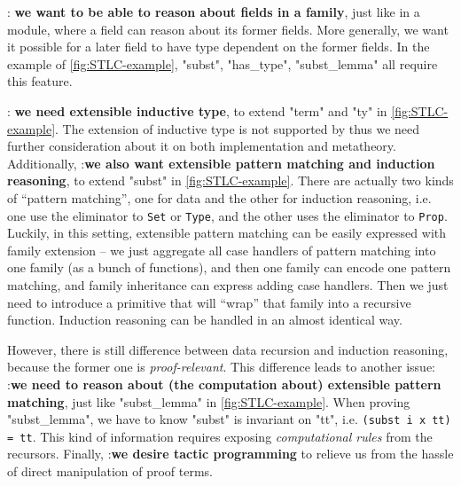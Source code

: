 :\textbf{ we want to be able to reason about fields in a family}, just like in a module, where a field can reason about its former fields. More generally, we want it possible for a later field to have type dependent on the former fields. In the example of \cref{fig:STLC-example}, "subst", "has_type", "subst_lemma" all require this feature.

:\textbf{ we need extensible inductive type}, to extend "term" and "ty" in \cref{fig:STLC-example}. The extension of inductive type is not supported by \citet{zm2017} thus we need further consideration about it on both implementation and metatheory. Additionally, :\textbf{we also want extensible pattern matching and induction reasoning}, to extend "subst" in \cref{fig:STLC-example}. There are actually two kinds of ``pattern matching'', one for data and the other for induction reasoning, i.e. one use the eliminator to \texttt{Set} or \texttt{Type}, and the other uses the eliminator to \texttt{Prop}. Luckily, in this setting, extensible pattern matching can be easily expressed with family extension -- we just aggregate all case handlers of pattern matching into one family (as a bunch of functions), and then one family can encode one pattern matching, and family inheritance can express adding case handlers. Then we just need to introduce a primitive that will ``wrap'' that family into a recursive function. Induction reasoning can be handled in an almost identical way. 

However, there is still difference between data recursion and induction reasoning, because the former one is \textit{proof-relevant}. This difference leads to another issue: :\textbf{we need to reason about (the computation about) extensible pattern matching}, just like "subst_lemma" in \cref{fig:STLC-example}. When proving "subst_lemma", we have to know "subst" is invariant on "tt", i.e. \texttt{(subst i x tt) = tt}. This kind of information requires exposing \textit{computational rules} from the recursors.
Finally, :\textbf{we desire tactic programming} to relieve us from the hassle of direct manipulation of proof terms.


